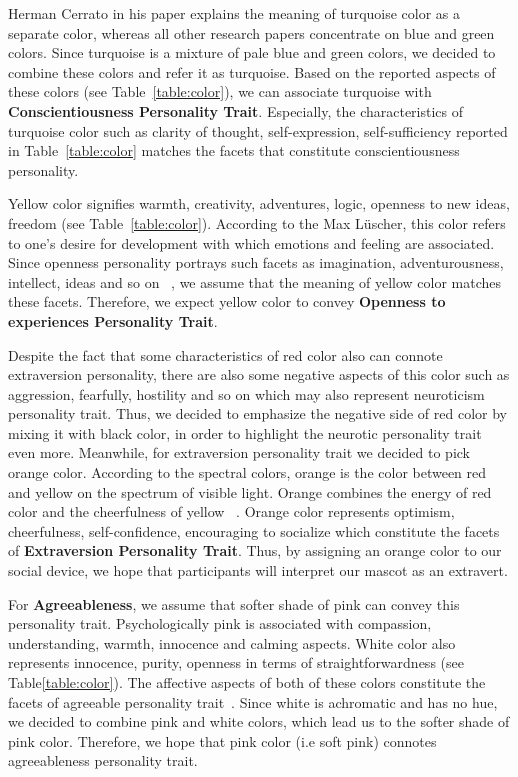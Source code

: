 \par Herman Cerrato in his paper explains the meaning of turquoise color as a separate color, whereas all other research papers concentrate on blue and green colors. Since turquoise is a mixture of pale blue and green colors, we decided to combine these colors and refer it as turquoise. Based on the reported aspects of these colors (see Table~\ref{table:color}), we can associate turquoise with \textbf{Conscientiousness Personality Trait}. Especially, the characteristics of turquoise color such as clarity of thought, self-expression, self-sufficiency reported in Table~\ref{table:color} matches the facets that constitute conscientiousness personality.

\par Yellow color signifies warmth, creativity, adventures, logic, openness to new ideas, freedom (see Table~\ref{table:color}). According to the Max Lüscher, this color refers to one’s desire for development with which emotions and feeling are associated. Since openness personality portrays such facets as imagination, adventurousness, intellect, ideas and so on ~\cite{costa1988catalog}, we assume that the meaning of yellow color matches these facets. Therefore, we expect yellow color to convey \textbf{Openness to experiences Personality Trait}.

\par Despite the fact that some characteristics of red color also can connote extraversion personality, there are also some negative aspects of this color such as aggression, fearfully, hostility and so on which may also represent neuroticism personality trait. Thus, we decided to emphasize the negative side of red color by mixing it with black color, in order to highlight the neurotic personality trait even more. Meanwhile, for extraversion personality trait we decided to pick orange color. According to the spectral colors, orange is the color between red and yellow on the spectrum of visible light. Orange combines the energy of red color and the cheerfulness of yellow ~\cite{cerrato2012meaning}. Orange color represents optimism, cheerfulness, self-confidence, encouraging to socialize which constitute the facets of  \textbf{Extraversion Personality Trait}. Thus, by assigning an orange color to our social device, we hope that participants will interpret our mascot as an extravert.

\par For \textbf{Agreeableness}, we assume that softer shade of pink can convey this personality trait. Psychologically pink is associated with compassion, understanding, warmth, innocence and calming aspects. White color also represents innocence, purity, openness in terms of straightforwardness (see Table\ref{table:color}). The affective aspects of both of these colors constitute the facets of agreeable personality trait~\cite{costa1988catalog}. Since white is achromatic and has no hue, we decided to combine pink and white colors, which lead us to the softer shade of pink color. Therefore, we hope that pink color (i.e soft pink) connotes agreeableness personality trait.


